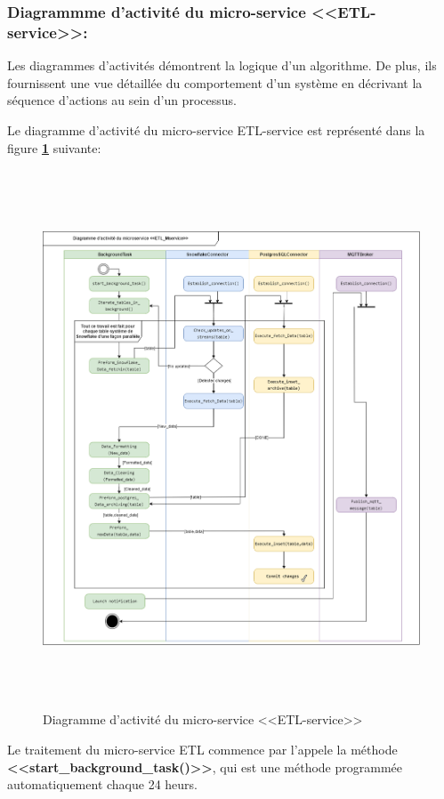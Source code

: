 \subsubsection{Diagrammme d'activité du micro-service <<ETL-service>>:}
\par Les diagrammes d'activités démontrent la logique d'un algorithme. De plus, ils fournissent une vue détaillée du comportement d'un système en décrivant la séquence d'actions au sein d'un processus\cite{diag_act}.
\par Le diagramme d'activité du micro-service ETL-service est représenté dans la figure \textbf{\ref{fig:act}} suivante:
    \begin{figure}[H]
        \centering
        \includegraphics[width =1\linewidth, height=16cm]{img/conception/diag_act_1.png}
        \caption{Diagramme d'activité du micro-service <<ETL-service>>}
            \label{fig:act}
        \end{figure}
\par Le traitement du micro-service ETL commence par l'appele la méthode \textbf{<<start\_background\_task()>>}, qui est une méthode programmée automatiquement chaque 24 heurs.
